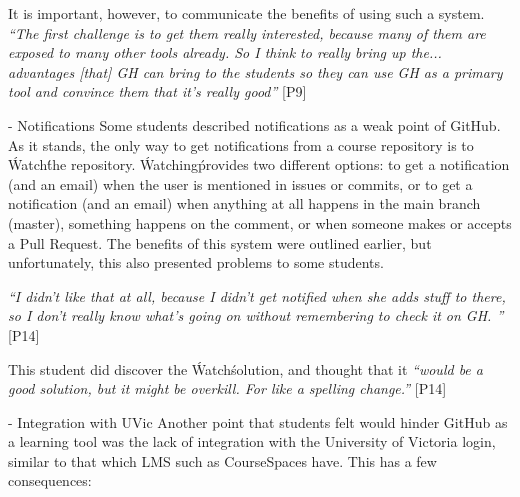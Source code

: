 It is important, however, to communicate the benefits of using such a system. \textit{``The first challenge is to get them really interested, because many of them are exposed to many other tools already. So I think to really bring up the... advantages [that] GH can bring to the students so they can use GH as a primary tool and convince them that it's really good''} [P9]

- Notifications
Some students described notifications as a weak point of GitHub. As it stands, the only way to get notifications from a course repository is to \'Watch\' the repository. \'Watching\' provides two different options: to get a notification (and an email) when the user is mentioned in issues or commits, or to get a notification (and an email) when anything at all happens in the main branch (master), something happens on the comment, or when someone makes or accepts a Pull Request. The benefits of this system were outlined earlier, but unfortunately, this also presented problems to some students.

\textit{``I didn't like that at all, because I didn't get notified when she adds stuff to there, so I don't really know what's going on without remembering to check it on GH. ''} [P14]

This student did discover the \'Watch\' solution, and thought that it \textit{``would be a good solution, but it might be overkill. For like a spelling change.''} [P14]

- Integration with UVic
Another point that students felt would hinder GitHub as a learning tool was the lack of integration with the University of Victoria login, similar to that which LMS such as CourseSpaces have. This has a few consequences: %




